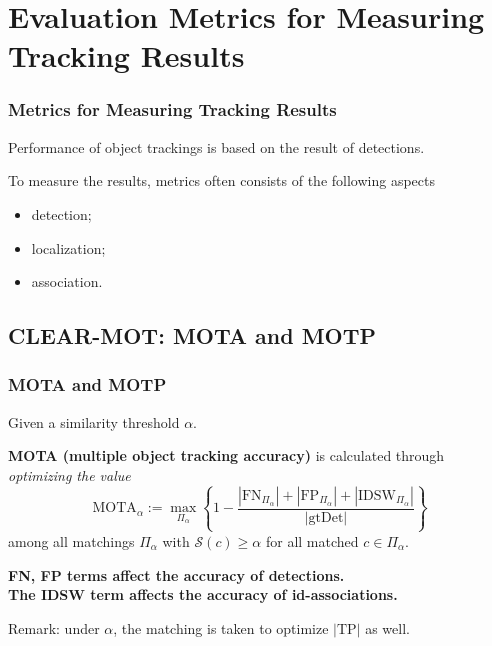 \documentclass[slidetop, mathserif]{beamer}
\begin{document}


\section{Evaluation Metrics for Measuring Tracking Results}

\begin{frame}
	\frametitle{Metrics for Measuring Tracking Results}
			
	Performance of object trackings is based on the result of detections.
			
	\quad 
			
	To measure the results, metrics often consists of the following aspects
	\begin{itemize}
		\item detection;%
		\item localization;%
		\item association.%
	\end{itemize}
			    
\end{frame}

\subsection{CLEAR-MOT: MOTA and MOTP}

\begin{frame}
	\frametitle{MOTA and MOTP}
			
			
	Given a similarity threshold $\alpha$.
			
	\vspace{4pt}
			
	{\bf MOTA (multiple object tracking accuracy)} is calculated through
	\emph{optimizing the value}
	\[
		\text{MOTA}_\alpha :=
		\max_{\Pi_\alpha}
		\left\{1 - \dfrac{|\text{FN}_{\Pi_\alpha}| + |\text{FP}_{\Pi_\alpha}| + |\text{IDSW}_{\Pi_\alpha}|}{|\text{gtDet}|}\right\}
	\]
	among all matchings $\Pi_\alpha$ with $\mathcal S(c)\geq \alpha$ for all matched $c\in\Pi_\alpha$.
			
	\vspace{4pt}
			
	{\bf\color{blue} FN, FP terms affect the accuracy of detections.} \\
	{\bf\color{olive} The IDSW term affects the accuracy of id-associations.}
			
	\vspace{4pt}
		
	Remark: under $\alpha$, the matching is taken to optimize $|\text{TP}|$ as well.
			
\end{frame}
\end{document}
